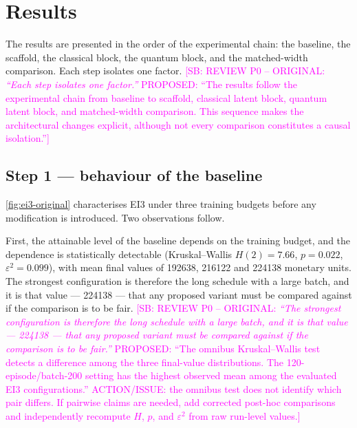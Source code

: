 \documentclass[aps,floatfix,superscriptaddress,twocolumn,tightenlines,amsmath,amssymb,nofootinbib,10pt,longbibliography,prl]{revtex4-2}
\newcommand{\sam}[1]{\textcolor{magenta}{[SB: {#1}]}}
\begin{document}
\section{Results}
\label{sec:results}

The results are presented in the order of the experimental chain: the baseline, the scaffold, the classical block, the quantum block, and the matched-width comparison. Each step isolates one factor.
\sam{REVIEW P0 -- ORIGINAL: \textit{``Each step isolates one factor.''} PROPOSED: ``The results follow the experimental chain from baseline to scaffold, classical latent block, quantum latent block, and matched-width comparison. This sequence makes the architectural changes explicit, although not every comparison constitutes a causal isolation.''}

\FloatBarrier
\subsection{Step 1 --- behaviour of the baseline}
\label{subsec:res-baseline}

\ref{fig:ei3-original} characterises EI3 under three training budgets before any modification is introduced. Two observations follow.

First, the attainable level of the baseline depends on the training budget, and the dependence is statistically detectable (Kruskal--Wallis $H(2) = 7.66$, $p = 0.022$, $\varepsilon^2 = 0.099$), with mean final values of \num{192638}, \num{216122} and \num{224138} monetary units. The strongest configuration is therefore the long schedule with a large batch, and it is that value --- \num{224138} --- that any proposed variant must be compared against if the comparison is to be fair.
\sam{REVIEW P0 -- ORIGINAL: \textit{``The strongest configuration is therefore the long schedule with a large batch, and it is that value --- \num{224138} --- that any proposed variant must be compared against if the comparison is to be fair.''} PROPOSED: ``The omnibus Kruskal--Wallis test detects a difference among the three final-value distributions. The 120-episode/batch-200 setting has the highest observed mean among the evaluated EI3 configurations.'' ACTION/ISSUE: the omnibus test does not identify which pair differs. If pairwise claims are needed, add corrected post-hoc comparisons and independently recompute $H$, $p$, and $\varepsilon^2$ from raw run-level values.}
\end{document}
